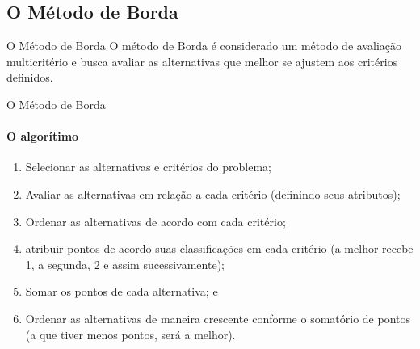 \documentclass[aspectratio=169]{beamer}
\begin{document}
\subsection{O Método de Borda}
\begin{frame}{O Método de Borda}
    O método de Borda é considerado um método de avaliação multicritério e busca avaliar as alternativas que melhor se ajustem aos critérios definidos. \cite{Barros2020}
\end{frame}

\begin{frame}{O Método de Borda}
\framesubtitle{O algorítimo}
   \begin{enumerate}
       \item Selecionar as alternativas e critérios do problema;
       \item Avaliar as alternativas em relação a cada critério (definindo seus atributos);
       \item Ordenar as alternativas de acordo com cada critério;
       \item atribuir pontos de acordo suas classificações em cada critério (a melhor recebe 1, a segunda, 2 e assim sucessivamente);
       \item Somar os pontos de cada alternativa; e
       \item Ordenar as alternativas de maneira crescente conforme o somatório de pontos (a que tiver menos pontos, será a melhor).
   \end{enumerate}
\end{frame}
\end{document}
